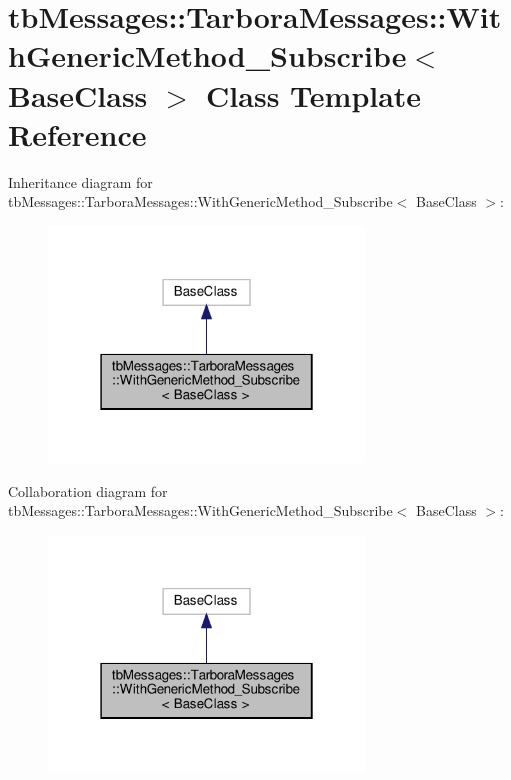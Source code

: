 \hypertarget{classtbMessages_1_1TarboraMessages_1_1WithGenericMethod__Subscribe}{}\section{tb\+Messages\+:\+:Tarbora\+Messages\+:\+:With\+Generic\+Method\+\_\+\+Subscribe$<$ Base\+Class $>$ Class Template Reference}
\label{classtbMessages_1_1TarboraMessages_1_1WithGenericMethod__Subscribe}


Inheritance diagram for tb\+Messages\+:\+:Tarbora\+Messages\+:\+:With\+Generic\+Method\+\_\+\+Subscribe$<$ Base\+Class $>$\+:
\nopagebreak
\begin{figure}[H]
\begin{center}
\leavevmode
\includegraphics[width=238pt]{classtbMessages_1_1TarboraMessages_1_1WithGenericMethod__Subscribe__inherit__graph}
\end{center}
\end{figure}


Collaboration diagram for tb\+Messages\+:\+:Tarbora\+Messages\+:\+:With\+Generic\+Method\+\_\+\+Subscribe$<$ Base\+Class $>$\+:
\nopagebreak
\begin{figure}[H]
\begin{center}
\leavevmode
\includegraphics[width=238pt]{classtbMessages_1_1TarboraMessages_1_1WithGenericMethod__Subscribe__coll__graph}
\end{center}
\end{figure}
